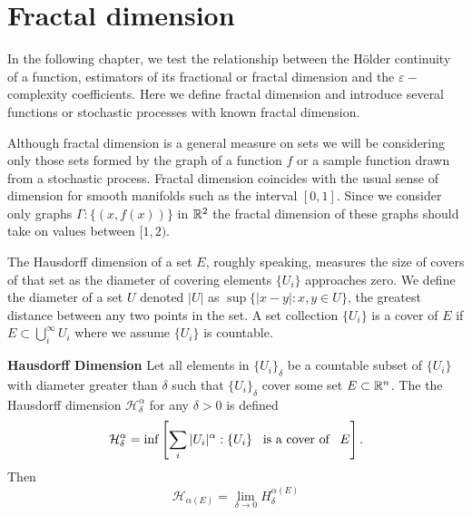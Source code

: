 \section{Fractal dimension}

In the following chapter, we test the 
relationship between the H\"older continuity 
of a function, estimators of its fractional or fractal
dimension and 
the $\varepsilon-$complexity coefficients. Here we define 
fractal dimension and introduce several 
functions or stochastic processes with known fractal 
dimension.

Although fractal dimension is a general measure on sets
we will be considering only those sets formed by the 
graph of a function $f$ or a sample function 
drawn from a stochastic process. Fractal dimension 
coincides with the usual sense of 
dimension for smooth manifolds such as the interval 
$[0,1]$. Since we consider only graphs
 $\Gamma:\{ (x, f(x)) \}$ in $\mathbb R^2$
the fractal dimension of these graphs should take on 
values between $[1,2)$.

The Hausdorff dimension of a set $E$, roughly speaking, 
measures the size of covers of that set 
as the diameter of covering elements
$\{ U_i \}$ approaches zero. We define the diameter 
of a set $U$ denoted $|U|$ as 
$\sup \{ | x- y| : x, y \in U\}$, the greatest distance 
between any two points in the set. A set collection 
$ \{ U_i \}$ is 
a cover of $E$ if $E \subset \bigcup_i^{\infty} U_i$
where we assume $\{ U_i \}$ is countable. 

\begin{defn}{\textbf{Hausdorff Dimension} }
Let all elements in $ \{ U_i \}_{\delta}$ be a
countable subset of $\{ U_i \}$ with diameter greater 
than $\delta$ such that $\{ U_i \}_{\delta}$ cover 
some set $E \subset \mathbb R^n$. The the Hausdorff dimension 
$\mathcal{H}_{\delta}^{\alpha}$ for any $\delta > 0$ 
is defined 
\begin{align*}
  \mathcal{H}_{\delta}^{\alpha} = \inf 
    \left[ \sum_i | U_i |^{\alpha} : \{ U_i \} \hspace{0.5em}\text{ is  a cover of  }\hspace{0.5em} E \right].
\end{align*}  
Then 
$$
\mathcal{H}_{\alpha(E)}=\lim_{\delta\to 0} H^{\alpha(E)}_\delta
$$

\end{defn}

